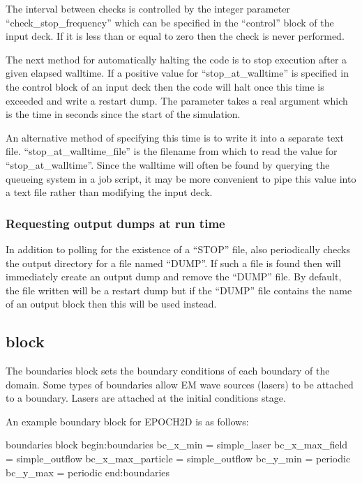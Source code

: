 The interval between checks is controlled by the integer parameter
``check\_stop\_frequency'' which can be specified in the ``control''
block of the input deck. If it is less than or equal to zero then
the check is never performed.

The next method for automatically halting the code is to stop execution after
a given elapsed walltime.
If a positive value for ``stop\_at\_walltime'' is specified in the
control block of an input deck then the code will halt once this
time is exceeded and write a restart dump. The parameter takes a real
argument which is the time in seconds since the start of the simulation.

An alternative method of specifying this time is to write it into a separate
text file. ``stop\_at\_walltime\_file'' is the filename from which to read the
value for ``stop\_at\_walltime''. Since the walltime will often be
found by querying the queueing system in a job script, it may be
more convenient to pipe this value into a text file rather than
modifying the input deck.

\subsubsection{Requesting output dumps at run time}
\label{sec:dump_request}
In addition to polling for the existence of a ``STOP'' file, {\EPOCH} also
periodically checks the output directory for a file named ``DUMP''. If such
a file is found then {\EPOCH} will immediately create an output dump and
remove the ``DUMP'' file. By default, the file written will be a restart
dump but if the ``DUMP'' file contains the name of an output block then this
will be used instead.


\subsection{ block}
\label{sec:boundaries_block}
The {\emphtext boundaries} block sets the boundary conditions of each boundary
of the domain. Some types of boundaries allow EM wave sources (lasers) to be
attached to a boundary. Lasers are attached at the initial conditions
stage.

An example boundary block for EPOCH2D is as follows:
\begin{lboxverbatim}{boundaries block}
begin:boundaries
   bc_x_min = simple_laser
   bc_x_max_field = simple_outflow
   bc_x_max_particle = simple_outflow
   bc_y_min = periodic
   bc_y_max = periodic
end:boundaries
\end{lboxverbatim}

